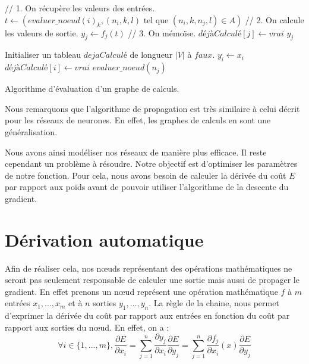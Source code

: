 \begin{algorithm} 
\begin{algorithmic}
		\State // 1. On récupère les valeurs des entrées.
		\State $t \leftarrow (evaluer\_noeud(i)_k, (n_i, k, l)\text{ tel que }(n_i, k, n_j, l) \in A)$
		\State // 2. On calcule les valeurs de sortie.
		\State $y_j \leftarrow f_j(t)$
		\State // 3. On mémoïse.
		\State $déjàCalculé[j] \leftarrow vrai$
	\EndIf
	\State \Return $y_j$
\EndFunction

\State Initialiser un tableau $dejaCalculé$ de longueur $|V|$ à $faux$.
	\State $y_i \leftarrow x_i$
	\State $déjàCalculé[i] \leftarrow vrai$ 
\EndFor
{}
	\State $evaluer\_noeud(n_j)$ 
\EndFor
\EndProcedure
\end{algorithmic}
\caption{Algorithme d'évaluation d'un graphe de calculs.}
\label{propagation_memoisation}
\end{algorithm}

Nous remarquons que l'algorithme de propagation est très similaire à celui décrit pour les réseaux de neurones. En effet, les graphes de calculs en sont une généralisation.

Nous avons ainsi modéliser nos réseaux de manière plus efficace. Il reste cependant un problème à résoudre. Notre objectif est d'optimiser les paramètres de notre fonction. Pour cela, nous avons besoin de calculer la dérivée du coût $E$ par rapport aux poids avant de pouvoir utiliser l'algorithme de la descente du gradient.

\section{Dérivation automatique}

Afin de réaliser cela, nos n\oe{}uds représentant des opérations mathématiques ne seront pas seulement responsable de calculer une sortie mais aussi de propager le gradient. En effet prenons un n\oe{}ud représent une opération mathématique $f$ à $m$ entrées $x_1, ..., x_m$ et à $n$ sorties $y_1, ..., y_n$. La règle de la chaine, nous permet d'exprimer la dérivée du coût par rapport aux entrées en fonction du coût par rapport aux sorties du n\oe{}ud. En effet, on a :
\begin{equation}
\forall i \in \{1, ...,  m\}, \frac{\partial E}{\partial x_i} = \sum_{j=1}^{n}{\frac{\partial y_j}{\partial x_i}\frac{\partial E}{\partial y_j}} = \sum_{j=1}^{n}{\frac{\partial f_j}{\partial x_i}(x)\frac{\partial E}{\partial y_j}}
\label{retropropagation_graphe}
\end{equation}

